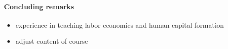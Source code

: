\paragraph{Concluding remarks}

\begin{itemize}
\item experience in teaching labor economics and human capital formation
\item adjust content of course
\end{itemize}
